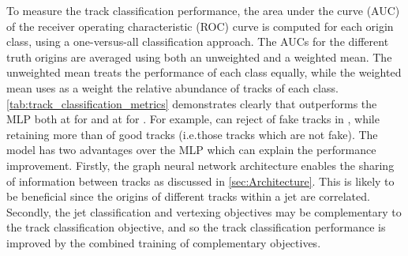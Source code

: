 To measure the track classification performance, the area under the curve (AUC) of the receiver operating characteristic (ROC) curve is computed for each origin class, using a one-versus-all classification approach.
The AUCs for the different truth origins are averaged using both an unweighted and a weighted mean.
The unweighted mean treats the performance of each class equally, while the weighted mean uses as a weight the relative abundance of tracks of each class.
\cref{tab:track_classification_metrics} demonstrates clearly that \GNN outperforms the MLP both at \ttbarpt for \ttbarjets and at \Zprimept for \Zprimejets.
For example, \GNN can reject  of fake tracks in \ttbarjets, while retaining more than  of good tracks (i.e.those tracks which are not fake).
The \GNN model has two advantages over the MLP which can explain the performance improvement.
Firstly, the graph neural network architecture enables the sharing of information between tracks as discussed in \cref{sec:Architecture}.
This is likely to be beneficial since the origins of different tracks within a jet are correlated.
Secondly, the jet classification and vertexing objectives may be complementary to the track classification objective, and so the track classification performance is improved by the combined training of complementary objectives.

